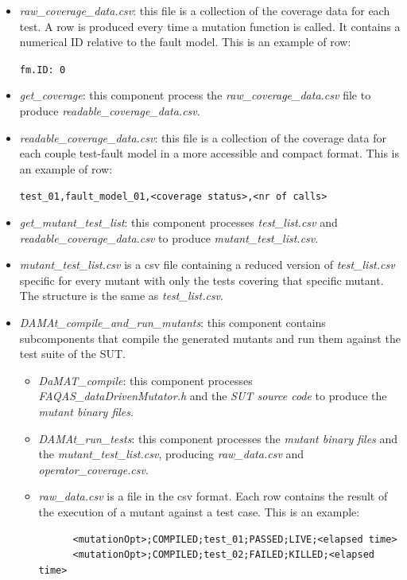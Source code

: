 \begin{itemize}
\begin{itemize}
    \item \textit{raw\_coverage\_data.csv}: this file is a collection of the coverage data for each test. A row is produced every time a mutation function is called. It contains a numerical ID relative to the fault model.
    This is an example of row:

    \texttt{fm.ID: 0}

    \item \textit{get\_coverage}: this component process the \textit{raw\_coverage\_data.csv} file to produce \textit{readable\_coverage\_data.csv}.

    \item \textit{readable\_coverage\_data.csv}: this file is a collection of the coverage data for each couple test-fault model in a more accessible and compact format.
    This is an example of row:

    \texttt{test\_01,fault\_model\_01,<coverage status>,<nr of calls>}

    \item \textit{get\_mutant\_test\_list}: this component processes \textit{test\_list.csv} and \textit{readable\_coverage\_data.csv} to produce \textit{mutant\_test\_list.csv}.

    \item \textit{mutant\_test\_list.csv} is a csv file containing a reduced version of \textit{test\_list.csv} specific for every mutant with only the tests covering that specific mutant. The structure is the same as \textit{test\_list.csv}.

    \item \textit{DAMAt\_compile\_and\_run\_mutants}: this component contains subcomponents that compile the generated mutants and run them against the test suite of the SUT.
    \begin{itemize}
      \item \textit{DaMAT\_compile}: this component processes \textit{FAQAS\_dataDrivenMutator.h} and the \textit{SUT source code} to produce the \textit{mutant binary files}.
      \item \textit{DAMAt\_run\_tests}: this component processes the \textit{mutant binary files} and the \textit{mutant\_test\_list.csv}, producing \textit{raw\_data.csv} and \textit{operator\_coverage.csv}.
      \item \textit{raw\_data.csv} is a file in the csv format. Each row contains the result of the execution of a mutant against a test case.
      This is an example:

      \begin{lstlisting}
      <mutationOpt>;COMPILED;test_01;PASSED;LIVE;<elapsed time>
      <mutationOpt>;COMPILED;test_02;FAILED;KILLED;<elapsed time>
      \end{lstlisting}


\end{itemize}
\end{itemize}
\end{itemize}
